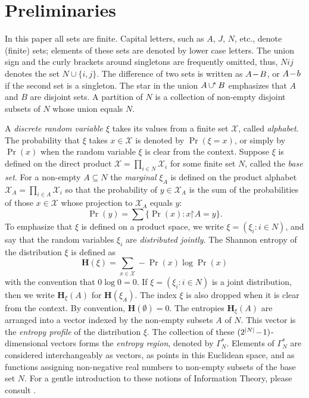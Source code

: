 \documentclass[reqno]{amsart}
\theoremstyle{definition}
\newcommand\tsp{\mkern 1.5mu}
\def\restr{\mathord\upharpoonright}
\newcommand\cups{\mathrel{\cup\mkern -1mu^*\mkern-3mu}}
\def\Hen{\mathbf H}
\renewcommand\cups{\mathop{{\cup}\mkern -2mu ^*}}
\def\m#1{\tsp{#1}\tsp}
\def\Ga#1{\Gamma^*_{\!#1}}
\begin{document}

\section{Preliminaries}\label{sec:prelim}

In this paper all sets are finite. Capital letters, such as $A$, $J$, $N$,
etc., denote (finite) sets; elements of these sets are denoted by lower case
letters. The union sign and the curly brackets around singletons are
frequently omitted, thus, $Nij$ denotes the set $N\cup\{i,j\}$. The
difference of two sets is written as $A\m-B$, or $A\m-b$ if the second set
is a singleton. The star in the union $A\cups B$ emphasizes that $A$ and $B$
are disjoint sets. A partition of $N$ is a collection of non-empty disjoint
subsets of $N$ whose union equals $N$.

A \emph{discrete random variable $\xi$} takes its values from a finite set
$\mathcal X$, called \emph{alphabet}. The probability that $\xi$ takes
$x\in\mathcal X$ is denoted by $\Pr(\xi=x)$, or simply by $\Pr(x)$ when the
random variable $\xi$ is clear from the context. Suppose $\xi$ is defined on
the direct product $\mathcal X=\prod_{i\in N} \mathcal X_i$ for some finite
set $N$, called the \emph{base set}. For a non-empty $A\subseteq N$ the
\emph{marginal $\xi_A$} is defined on the product alphabet $\mathcal X_A =
\prod_{i\in A}\mathcal X_i$ so that the probability of $y\in \mathcal X_A$
is the sum of the probabilities of those $x\in\mathcal X$ whose projection
to $\mathcal X_A$ equals $y$:
$$
   \Pr(y) = \sum \{ \Pr(x): x\restr A = y \}.
$$
To emphasize that $\xi$ is defined on a product space, we write
$\xi=(\xi_i:i\in N)$, and say that the random variables $\xi_i$ are
\emph{distributed jointly}. The Shannon entropy of the distribution
$\xi$ is defined as
$$
   \Hen(\xi) = \sum_{x\in\mathcal X} -\Pr(x)\log \Pr(x)
$$
with the convention that $0\log 0 = 0$. If $\xi=(\xi_i:i\in N)$ is a joint
distribution, then we write $\Hen_\xi(A)$ for $\Hen(\xi_A)$. The index $\xi$
is also dropped when it is clear from the context. By convention,
$\Hen(\emptyset)=0$. The entropies $\Hen_\xi(A)$ are arranged into a vector
indexed by the non-empty subsets $A$ of $N$. This vector is the
\emph{entropy profile} of the distribution $\xi$. The collection of these
$(2^{|N|}\m-1)$-dimensional vectors forms the \emph{entropy region}, denoted
by $\Ga N$. Elements of $\Ga N$ are considered interchangeably as vectors,
as points in this Euclidean space, and as functions assigning non-negative
real numbers to non-empty subsets of the base set $N$. For a gentle
introduction to these notions of Information Theory, please consult
\cite{yeung-book}.
\end{document}
